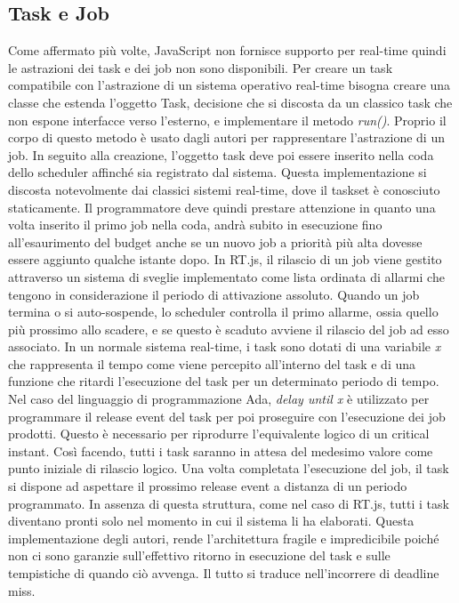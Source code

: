 \documentclass[conference]{IEEEtran}
\begin{document}
\subsection{Task e Job}
Come affermato più volte, JavaScript non fornisce supporto per real-time quindi le astrazioni dei task e dei job non sono disponibili. Per creare un task compatibile con l'astrazione di un sistema operativo real-time bisogna creare una classe che estenda l'oggetto Task, decisione che si discosta da un classico task che non espone interfacce verso l'esterno, e implementare il metodo \textit{run()}. Proprio il corpo di questo metodo è usato dagli autori per rappresentare l'astrazione di un job. In seguito alla creazione, l'oggetto task deve poi essere inserito nella coda dello scheduler affinché sia registrato dal sistema. Questa implementazione si discosta notevolmente dai classici sistemi real-time, dove il taskset è conosciuto staticamente. Il programmatore deve quindi prestare attenzione in quanto una volta inserito il primo job nella coda, andrà subito in esecuzione fino all'esaurimento del budget anche se un nuovo job a priorità più alta dovesse essere aggiunto qualche istante dopo. 
\newline
In RT.js, il rilascio di un job viene gestito attraverso un sistema di sveglie implementato come lista ordinata di allarmi che tengono in considerazione il periodo di attivazione assoluto. Quando un job termina o si auto-sospende, lo scheduler controlla il primo allarme, ossia quello più prossimo allo scadere, e se questo è scaduto avviene il rilascio del job ad esso associato.
\newline
In un normale sistema real-time, i task sono dotati di una variabile \textit{x} che rappresenta il tempo come viene percepito all'interno del task e di una funzione che ritardi l'esecuzione del task per un determinato periodo di tempo. Nel caso del linguaggio di programmazione Ada, \textit{delay until x} è utilizzato per programmare il release event del task per poi proseguire con l'esecuzione dei job prodotti. Questo è necessario per riprodurre l'equivalente logico di un critical instant. Così facendo, tutti i task saranno in attesa del medesimo valore come punto iniziale di rilascio logico. Una volta completata l'esecuzione del job, il task si dispone ad aspettare il prossimo release event a distanza di un periodo programmato. In assenza di questa struttura, come nel caso di RT.js, tutti i task diventano pronti solo nel momento in cui il sistema li ha elaborati. Questa implementazione degli autori, rende l'architettura fragile e impredicibile poiché non ci sono garanzie sull'effettivo ritorno in esecuzione del task e sulle tempistiche di quando ciò avvenga. Il tutto si traduce nell'incorrere di deadline miss. 
\end{document}
